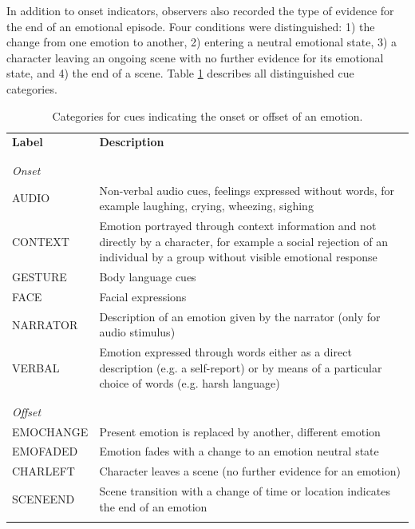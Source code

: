\documentclass[10pt,a4paper,twocolumn]{article}
\begin{document}
In addition to onset indicators, observers also recorded the type of evidence
for the end of an emotional episode. Four conditions were distinguished: 1) the
change from one emotion to another, 2) entering a neutral emotional state, 3) a
character leaving an ongoing scene with no further evidence for its emotional
state, and 4) the end of a scene.  Table \ref{tab:onoffset_indicators}
describes all distinguished cue categories.

\begin{table}
  \centering
  \begin{tabular}{lp{10cm}}
    \textbf{Label} & \textbf{Description} \\
    \\\hline\\
    \textit{Onset}\\
    AUDIO & Non-verbal audio cues, feelings expressed without words, for example laughing, crying, wheezing, sighing\\
    CONTEXT & Emotion portrayed through context information and not directly by a character, for example a social rejection of an individual by a group without visible emotional response\\
    GESTURE & Body language cues \\
    FACE & Facial expressions \\
    NARRATOR & Description of an emotion given by the narrator (only for audio stimulus)\\
    VERBAL & Emotion expressed through words either as a direct description (e.g. a self-report) or by means of a particular choice of words (e.g. harsh language)\\
    \\\hline\\
    \textit{Offset}\\
    EMOCHANGE & Present emotion is replaced by another, different emotion \\
    EMOFADED & Emotion fades with a change to an emotion neutral state \\
    CHARLEFT & Character leaves a scene (no further evidence for an emotion)\\
    SCENEEND & Scene transition with a change of time or location indicates the end of an emotion\\
    \\\hline

  \end{tabular}
  \caption{Categories for cues indicating the onset or offset of an emotion.}
  \label{tab:onoffset_indicators}
\end{table}
\end{document}
